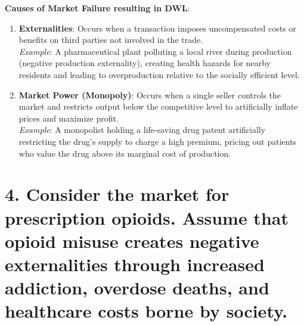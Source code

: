 \documentclass[11pt, letterpaper]{article}
\begin{document}
\textbf{Causes of Market Failure resulting in DWL}:
\begin{enumerate}[leftmargin=*]
    \item \textbf{Externalities}: Occurs when a transaction imposes uncompensated costs or benefits on third parties not involved in the trade. \\
    \textit{Example}: A pharmaceutical plant polluting a local river during production (negative production externality), creating health hazards for nearby residents and leading to overproduction relative to the socially efficient level.
    \item \textbf{Market Power (Monopoly)}: Occurs when a single seller controls the market and restricts output below the competitive level to artificially inflate prices and maximize profit. \\
    \textit{Example}: A monopolist holding a life-saving drug patent artificially restricting the drug's supply to charge a high premium, pricing out patients who value the drug above its marginal cost of production.
\end{enumerate}

\section*{4. Consider the market for prescription opioids. Assume that opioid misuse creates negative externalities through increased addiction, overdose deaths, and healthcare costs borne by society.}
\end{document}
